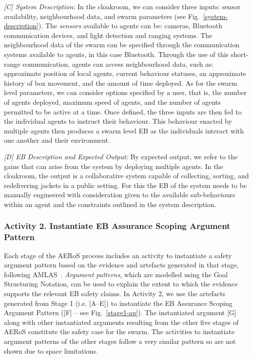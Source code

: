 \documentclass[runningheads]{llncs}
\begin{document}

\emph{[C] System Description:}
In the cloakroom, we can consider three inputs: sensor availability, neighbourhood data, and swarm parameters (see Fig.~\ref{system-description}). The \emph{sensors} available to agents can be: cameras, Bluetooth communication devices, and light detection and ranging systems. 
The neighbourhood data of the swarm can be specified through the communication systems available to agents, in this case Bluetooth. 
Through the use of this short-range communication, agents can access neighbourhood data, such as: approximate position of local agents, current behaviour statuses, an approximate history of box movement, and the amount of time deployed. 
As for the swarm level parameters, we can consider options specified by a user, that is, the number of agents deployed, maximum speed of agents, and the number of agents permitted to be active at a time.
Once defined, the three inputs are then fed to the individual agents to instruct their behaviour. This behaviour enacted by multiple agents then produces a swarm level EB as the individuals interact with one another and their environment.

\emph{[D] EB Description and Expected Output:}
By expected output, we refer to the gains that can arise from the system by deploying multiple agents. 
In the cloakroom, the output is a collaborative system capable of collecting, sorting, and redelivering jackets in a public setting. 
For this the EB of the system needs to be manually engineered with consideration given to the available sub-behaviours within an agent and the constraints outlined in the system description.

\subsubsection*{Activity 2. Instantiate EB Assurance Scoping Argument Pattern}
Each stage of the AERoS process includes an activity to instantiate a safety argument pattern based on the evidence and artefacts generated in that stage, following AMLAS~\cite{Hawkins2021}. 
\emph{Argument patterns}, which are modelled using the Goal Structuring Notation, can be used to explain the extent to which the evidence supports the relevant EB safety claims.  
In Activity 2, we use the artefacts generated from Stage 1 (i.e. [A–E]) to instantiate the EB Assurance Scoping Argument Pattern ([F] – see Fig.~\ref{stage1-ap}). 
The instantiated argument [G] along with other instantiated arguments resulting from the other five stages of AERoS constitute the safety case for the swarm. The activities to instantiate argument patterns of the other stages follow a very similar pattern so are not shown due to space limitations.
\end{document}
